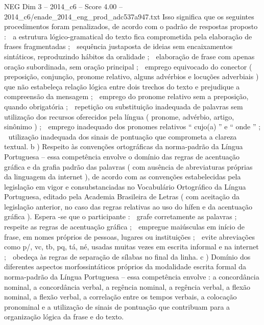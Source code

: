 \begin{textsample}{NEG Dim 3 – 2014\_c6 – Score 4.00 – 2014\_c6/enade\_2014\_eng\_prod\_adc537a947.txt}
Isso significa que os seguintes procedimentos foram penalizados, de acordo com o padrão de respostas proposto :  a estrutura lógico-gramatical do texto fica comprometida pela elaboração de frases fragmentadas ;  sequência justaposta de ideias sem encaixamentos sintáticos, reproduzindo hábitos da oralidade ;  elaboração de frase com apenas oração subordinada, sem oração principal ;  emprego equivocado do conector ( preposição, conjunção, pronome relativo, alguns advérbios e locuções adverbiais ) que não estabeleça relação lógica entre dois trechos do texto e prejudique a compreensão da mensagem ;  emprego do pronome relativo sem a preposição, quando obrigatória ;  repetição ou substituição inadequada de palavras sem utilização dos recursos oferecidos pela língua ( pronome, advérbio, artigo, sinônimo ) ;  emprego inadequado dos pronomes relativos “ cujo(a) ” e “ onde ” ;  utilização inadequada dos sinais de pontuação que comprometa a clareza textual. b ) Respeito às convenções ortográficas da norma-padrão da Língua Portuguesa – essa competência envolve o domínio das regras de acentuação gráfica e da grafia padrão das palavras ( com ausência de abreviaturas próprias da linguagem da internet ), de acordo com as convenções estabelecidas pela legislação em vigor e consubstanciadas no Vocabulário Ortográfico da Língua Portuguesa, editado pela Academia Brasileira de Letras ( com aceitação da legislação anterior, no caso das regras relativas ao uso do hífen e da acentuação gráfica ).
Espera -se que o participante :  grafe corretamente as palavras ;  respeite as regras de acentuação gráfica ;  empregue maiúsculas em início de frase, em nomes próprios de pessoas, lugares ou instituições ;  evite abreviações como p/, vc, tb, pq, tá, né, usadas muitas vezes em escrita informal e na internet ;  obedeça às regras de separação de sílabas no final da linha. c ) Domínio dos diferentes aspectos morfossintáticos próprios da modalidade escrita formal da norma-padrão da Língua Portuguesa – essa competência envolve : a concordância nominal, a concordância verbal, a regência nominal, a regência verbal, a flexão nominal, a flexão verbal, a correlação entre os tempos verbais, a colocação pronominal e a utilização de sinais de pontuação que contribuam para a organização lógica da frase e do texto.

\end{textsample}
